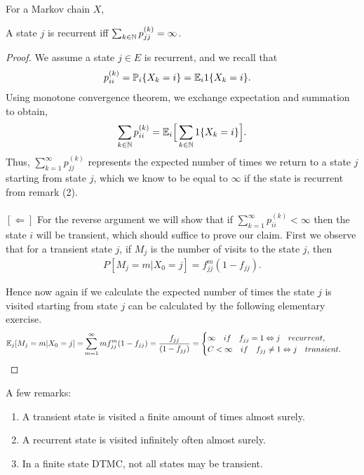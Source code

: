 \documentclass[a4paper,10pt,english]{article}
\begin{document}
\begin{cor} 
For a Markov chain $X$, 
\end{cor}
\begin{prop}
A state $j$ is recurrent iff
$\sum_{k\in\mathbb{N}} p_{jj}^{(k)} = \infty$.
\end{prop}
\begin{proof}
We assume a state $j \in E$ is recurrent, and we recall that 
\begin{align*}
p_{ii}^{(k)} &= \mathbb{P}_i\{X_k=i\} = \mathbb{E}_i 1\{X_k=i\}.
\end{align*}
Using monotone convergence theorem, we exchange expectation and summation to obtain, 
\begin{align*}
\sum_{k\in \mathbb{N}}p_{ii}^{(k)}=\mathbb{E}_i\Big[\sum_{k\in\mathbb{N}}1\{X_k=i\}\Big].
\end{align*}
Thus, $\sum_{k=1}^\infty p_{jj}^{(k)}$ represents the expected number of times we return to a state $j$ starting from state $j$, which we know to be equal to $\infty$ if the state is recurrent from remark (2).\\\\
$[\Leftarrow]$ For the reverse argument we will show that if $\sum_{k=1}^{\infty}p_{ii}^{(k)}<\infty$ then the state $i$ will be transient, which should suffice to prove our claim. First we observe that for a transient state $j$, if $M_j$ is the number of visits to the state $j$, then
\begin{align*}P[M_j=m|X_0=j]=f_{jj}^m(1-f_{jj}).\end{align*} 

Hence now again if we calculate the expected number of times the state $j$ is visited starting from state $j$ can be calculated by the following elementary exercise.
\begin{align*}
\mathbb{E}_j[M_j=m|X_0=j]= & \sum_{m=1}^{\infty}mf_{jj}^m(1-f_{jj})=\frac{f_{jj}}{(1-f_{jj})}=
\begin{cases}
\infty \quad if \quad f_{jj}=1 \Leftrightarrow j \quad  recurrent,\\
C<\infty \quad if \quad f_{jj} \neq 1 \Leftrightarrow j \quad transient.
\end{cases}
\end{align*}
\end{proof}
A few remarks:
\begin{enumerate}
	\item A transient state is visited a finite amount of times almost surely.
	\item A recurrent state is visited infinitely often almost surely.
	\item In a finite state DTMC, not all states may be transient. 
\end{enumerate} 
\end{document}
